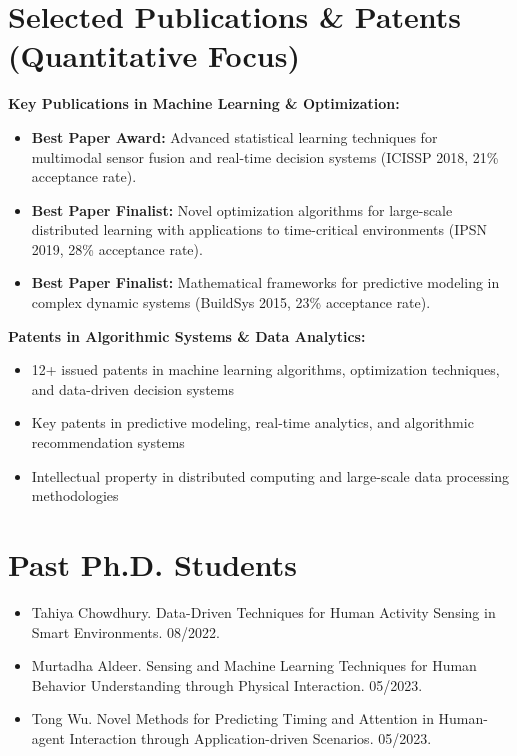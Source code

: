 \documentclass[12pt]{article}
\begin{document}
\section{Selected Publications \& Patents (Quantitative Focus)}
\textbf{Key Publications in Machine Learning \& Optimization:}
\begin{itemize}
    \item \textbf{Best Paper Award:} Advanced statistical learning techniques for multimodal sensor fusion and real-time decision systems (ICISSP 2018, 21\% acceptance rate).
    \item \textbf{Best Paper Finalist:} Novel optimization algorithms for large-scale distributed learning with applications to time-critical environments (IPSN 2019, 28\% acceptance rate).
    \item \textbf{Best Paper Finalist:} Mathematical frameworks for predictive modeling in complex dynamic systems (BuildSys 2015, 23\% acceptance rate).
\end{itemize}

\textbf{Patents in Algorithmic Systems \& Data Analytics:}
\begin{itemize}
    \item 12+ issued patents in machine learning algorithms, optimization techniques, and data-driven decision systems
    \item Key patents in predictive modeling, real-time analytics, and algorithmic recommendation systems
    \item Intellectual property in distributed computing and large-scale data processing methodologies
\end{itemize}

\section{Past Ph.D. Students}
\begin{itemize}
    \item Tahiya Chowdhury. Data-Driven Techniques for Human Activity Sensing in Smart Environments. 08/2022.
    \item Murtadha Aldeer. Sensing and Machine Learning Techniques for Human Behavior Understanding through Physical Interaction. 05/2023.
    \item Tong Wu. Novel Methods for Predicting Timing and Attention in Human-agent Interaction through Application-driven Scenarios. 05/2023.
\end{itemize}
\end{document}
